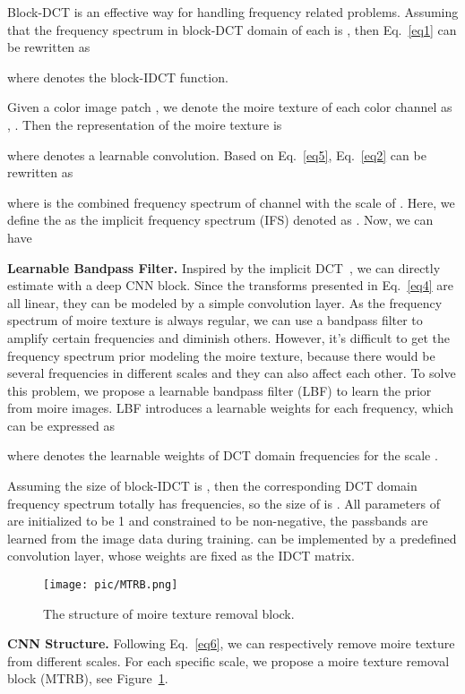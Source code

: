 \documentclass[10pt,twocolumn,letterpaper]{article}
\begin{document}
Block-DCT is an effective way for handling frequency related problems.
Assuming that the frequency spectrum in block-DCT domain of each  is , then Eq.~\ref{eq1} can be rewritten as

where  denotes the block-IDCT function. 

Given a color image patch , we denote the moire texture of each color channel as , . Then the representation of the moire texture  is

where  denotes a learnable convolution.
Based on Eq.~\ref{eq5}, Eq.~\ref{eq2} can be rewritten as 

where  is the combined frequency spectrum of channel  with the scale of . 
Here, we define the  as the implicit frequency spectrum (IFS) denoted as . 
Now, we can have


\textbf{Learnable Bandpass Filter.} 
Inspired by the implicit DCT~\cite{IDCN}, we can directly estimate   with a deep CNN block. 
Since the transforms presented in Eq.~\ref{eq4} are all linear, they can be modeled by a simple convolution layer. 
As the frequency spectrum of moire texture is always regular, we can use a bandpass filter to amplify certain frequencies and diminish others. 
However, it's difficult to get the frequency spectrum prior modeling the moire texture, because there would be several frequencies in different scales and they can also affect each other. 
To solve this problem, we propose a learnable bandpass filter (LBF) to learn the prior from moire images. 
LBF introduces a learnable weights for each frequency, which can be expressed as

where  denotes the learnable weights of DCT domain frequencies for the scale . 

Assuming the size of block-IDCT is , then the corresponding DCT domain frequency spectrum totally has  frequencies, so the size of  is . 
All parameters of   are initialized to be 1 and constrained to be non-negative, the passbands are learned from the image data during training. 
 can be implemented by a predefined  convolution layer, whose weights are fixed as the IDCT matrix.


\begin{figure}[t]
	\centering
	\texttt{[image: pic/MTRB.png]}
	\caption{The structure of moire texture removal block.}
	\label{MTRB}
\end{figure}

\textbf{CNN Structure.} 
Following Eq.~\ref{eq6}, we can respectively remove moire texture from different scales. 
For each specific scale,  we propose a moire texture removal block (MTRB), see Figure~\ref{MTRB}. 
\begin{comment}
Assuming the input of the MTRB is , a dense block is first used for feature extraction, which is denoted as . 
The dense block has  densely connected~\cite{DenseNet}  -channel dilated convolution~\cite{DILATED_CONV} with ReLU activation () layers, which can be represented as

where  denotes the ,  denotes the dilation rate of the th dilated convolution layer, and  denotes the channel concatenating. 
Then a  convolution layer estimates the IFS  from , which can be represented as

\end{comment}
\end{document}
